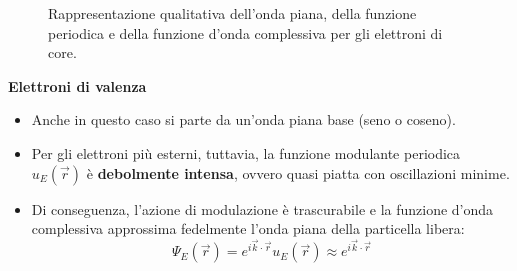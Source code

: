 \begin{figure}[htbp]
    \centering
    \caption{Rappresentazione qualitativa dell'onda piana, della funzione periodica e della funzione d'onda complessiva per gli elettroni di core.}
    \label{fig:elettroni_core}
\end{figure}

\begin{example}{\textbf{Elettroni di valenza}}   
\begin{itemize}
    \item Anche in questo caso si parte da un'onda piana base (seno o coseno).
    \item Per gli elettroni più esterni, tuttavia, la funzione modulante periodica \(u_E(\vec{r})\) è \textbf{debolmente intensa}, ovvero quasi piatta con oscillazioni minime.
    \item Di conseguenza, l'azione di modulazione è trascurabile e la funzione d'onda complessiva approssima fedelmente l'onda piana della particella libera:
    \begin{equation}
        \Psi_E(\vec{r}) = e^{i\vec{k}\cdot\vec{r}} u_E(\vec{r}) \approx e^{i\vec{k}\cdot\vec{r}}
    \end{equation}
\end{itemize}
\end{example}

